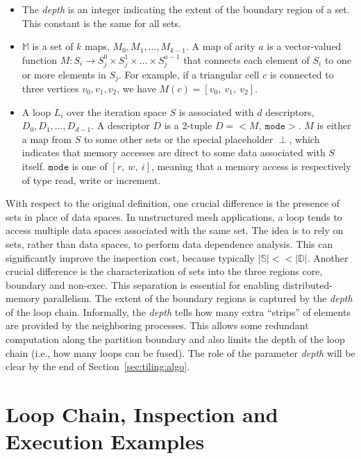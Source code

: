 \begin{itemize}
\item The {\em depth} is an integer indicating the extent of the boundary region of a set. This constant is the same for all sets. 

\item $\mathbb{M}$ is a set of $k$ maps, $M_0, M_1, ..., M_{k-1}$. A map of arity $a$ is a vector-valued function $M : S_i \rightarrow S_j^0 \times S_j^1 \times ... \times S_j^{a-1}$ that connects each element of $S_i$ to one or more elements in $S_j$. For example, if a triangular cell $c$ is connected to three vertices $v_0,v_1,v_2$, we have $M(c) = [v_0,\ v_1,\ v_2]$. 

\item A loop $L_i$ over the iteration space $S$ is associated with $d$ descriptors, $D_0, D_1, ..., D_{d-1}$. A descriptor $D$ is a 2-tuple $D = {<}M,\ \texttt{mode}{>}$. $M$ is either a map from $S$ to some other sets or the special placeholder $\perp$, which indicates that memory accesses are direct to some data associated with $S$ itself. $\texttt{mode}$ is one of $[r,\ w,\ i]$, meaning that a memory access is respectively of type read, write or increment.
\end{itemize}

With respect to the original definition, one crucial difference is the presence of sets in place of data spaces. In unstructured mesh applications, a loop tends to access multiple data spaces associated with the same set. The idea is to rely on sets, rather than data spaces, to perform data dependence analysis. This can significantly improve the inspection cost, because typically $|\mathbb{S}| << |\mathbb{D}|$. Another crucial difference is the characterization of sets into the three regions core, boundary and non-exec. This separation is essential for enabling distributed-memory parallelism. The extent of the boundary regions is captured by the {\em depth} of the loop chain. Informally, the {\em depth} tells how many extra ``strips'' of elements are provided by the neighboring processes. This allows some redundant computation along the partition boundary and also limits the depth of the loop chain (i.e., how many loops can be fused). The role of the parameter {\em depth} will be clear by the end of Section~\ref{sec:tiling:algo}. 


\section{Loop Chain, Inspection and Execution Examples}
\label{sec:tiling:examples}

